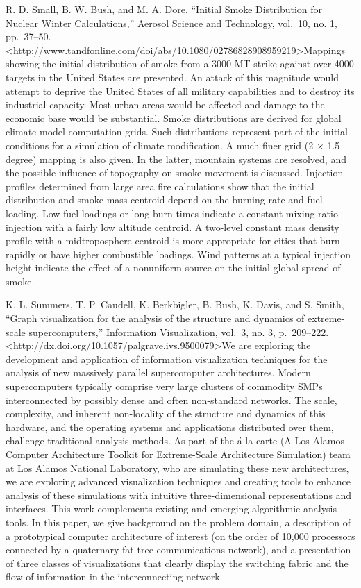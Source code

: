 \documentclass[]{article}
\begin{document}
R. D. Small, B. W. Bush, and M. A. Dore, ``Initial Smoke Distribution
for Nuclear Winter Calculations,'' Aerosol Science and Technology,
vol.~10, no. 1, pp.~37--50.
\textless{}http://www.tandfonline.com/doi/abs/10.1080/02786828908959219\textgreater{}Mappings
showing the initial distribution of smoke from a 3000 MT strike against
over 4000 targets in the United States are presented. An attack of this
magnitude would attempt to deprive the United States of all military
capabilities and to destroy its industrial capacity. Most urban areas
would be affected and damage to the economic base would be substantial.
Smoke distributions are derived for global climate model computation
grids. Such distributions represent part of the initial conditions for a
simulation of climate modification. A much finer grid (2 × 1.5 degree)
mapping is also given. In the latter, mountain systems are resolved, and
the possible influence of topography on smoke movement is discussed.
Injection profiles determined from large area fire calculations show
that the initial distribution and smoke mass centroid depend on the
burning rate and fuel loading. Low fuel loadings or long burn times
indicate a constant mixing ratio injection with a fairly low altitude
centroid. A two-level constant mass density profile with a
midtroposphere centroid is more appropriate for cities that burn rapidly
or have higher combustible loadings. Wind patterns at a typical
injection height indicate the effect of a nonuniform source on the
initial global spread of smoke.

K. L. Summers, T. P. Caudell, K. Berkbigler, B. Bush, K. Davis, and S.
Smith, ``Graph visualization for the analysis of the structure and
dynamics of extreme-scale supercomputers,'' Information Visualization,
vol.~3, no. 3, p.~209--222.
\textless{}http://dx.doi.org/10.1057/palgrave.ivs.9500079\textgreater{}We
are exploring the development and application of information
visualization techniques for the analysis of new massively parallel
supercomputer architectures. Modern supercomputers typically comprise
very large clusters of commodity SMPs interconnected by possibly dense
and often non-standard networks. The scale, complexity, and inherent
non-locality of the structure and dynamics of this hardware, and the
operating systems and applications distributed over them, challenge
traditional analysis methods. As part of the á la carte (A Los Alamos
Computer Architecture Toolkit for Extreme-Scale Architecture Simulation)
team at Los Alamos National Laboratory, who are simulating these new
architectures, we are exploring advanced visualization techniques and
creating tools to enhance analysis of these simulations with intuitive
three-dimensional representations and interfaces. This work complements
existing and emerging algorithmic analysis tools. In this paper, we give
background on the problem domain, a description of a prototypical
computer architecture of interest (on the order of 10,000 processors
connected by a quaternary fat-tree communications network), and a
presentation of three classes of visualizations that clearly display the
switching fabric and the flow of information in the interconnecting
network.
\end{document}
